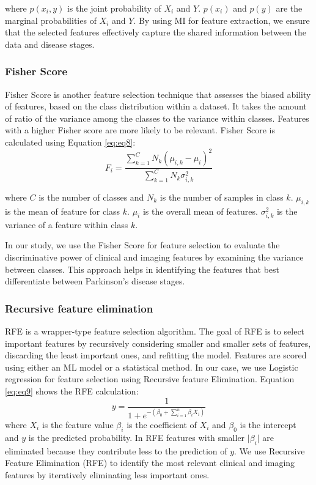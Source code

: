 \documentclass{article}
\begin{document}
where $p\left(x_i,y\right)$ is the joint probability of $X_i$ and $Y$. $p\left(x_i\right)$ and $p\left(y\right)$ are the marginal probabilities of $X_i$ and $Y$. By using MI for feature extraction, we ensure that the selected features effectively capture the shared information between the data and disease stages.

\subsubsection{Fisher Score}

Fisher Score is another feature selection technique that assesses the biased ability of features, based on the class distribution within a dataset. It takes the amount of ratio of the variance among the classes to the variance within classes. Features with a higher Fisher score are more likely to be relevant. Fisher Score is calculated using Equation \eqref{eq:eq8}:
\begin{equation}
    F_i = \frac{\sum_{k=1}^{C}N_k(\mu_{i,k}-\mu_i)^2}{\sum_{k=1}^{C}N_k\sigma_{i,k}^2}
    \label{eq:eq8}
\end{equation}

where $C$ is the number of classes and $N_k$ is the number of samples in class $k$. $\mu_{i,k}$ is the mean of feature  for class $k$. $\mu_i$ is the overall mean of features. $\sigma_{i,k}^2$ is the variance of a feature within class $k$.

In our study, we use the Fisher Score for feature selection to evaluate the discriminative power of clinical and imaging features by examining the variance between classes. This approach helps in identifying the features that best differentiate between Parkinson's disease stages.

\subsubsection{Recursive feature elimination}

RFE is a wrapper-type feature selection algorithm. The goal of RFE is to select important features by recursively considering smaller and smaller sets of features, discarding the least important ones, and refitting the model. Features are scored using either an ML model or a statistical method. In our case, we use Logistic regression for feature selection using Recursive feature Elimination. Equation \eqref{eq:eq9} shows the RFE calculation:
\begin{equation}
    y = \frac{1}{1+e^{-(\beta_0 + \sum_{i=1}^n\beta_iX_i)}}
    \label{eq:eq9}
\end{equation}
where $X_i$ is the feature value $\beta_i$ is the coefficient of $X_i$ and $\beta_0$ is the intercept and $y$ is the predicted probability. In RFE features with smaller ${|\beta}_i|$ are eliminated because they contribute less to the prediction of $y$. We use Recursive Feature Elimination (RFE) to identify the most relevant clinical and imaging features by iteratively eliminating less important ones.
\end{document}
